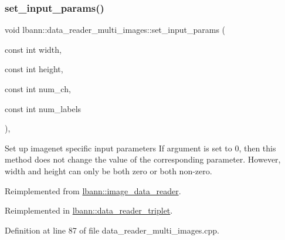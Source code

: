 \subsubsection{\texorpdfstring{set\+\_\+input\+\_\+params()}{set\_input\_params()}\hspace{0.1cm}{\footnotesize\ttfamily [2/2]}}
{\footnotesize\ttfamily void lbann\+::data\+\_\+reader\+\_\+multi\+\_\+images\+::set\+\_\+input\+\_\+params (\begin{DoxyParamCaption}\item[{const int}]{width,  }\item[{const int}]{height,  }\item[{const int}]{num\+\_\+ch,  }\item[{const int}]{num\+\_\+labels }\end{DoxyParamCaption})\hspace{0.3cm}{\ttfamily [override]}, {\ttfamily [virtual]}}

Set up imagenet specific input parameters If argument is set to 0, then this method does not change the value of the corresponding parameter. However, width and height can only be both zero or both non-\/zero. 

Reimplemented from \hyperlink{classlbann_1_1image__data__reader_a6ed9b8b12ad3ffa93ad458d872f8c044}{lbann\+::image\+\_\+data\+\_\+reader}.



Reimplemented in \hyperlink{classlbann_1_1data__reader__triplet_a8172b4ac97d18b51814578a19a7f75c7}{lbann\+::data\+\_\+reader\+\_\+triplet}.



Definition at line 87 of file data\+\_\+reader\+\_\+multi\+\_\+images.\+cpp.


